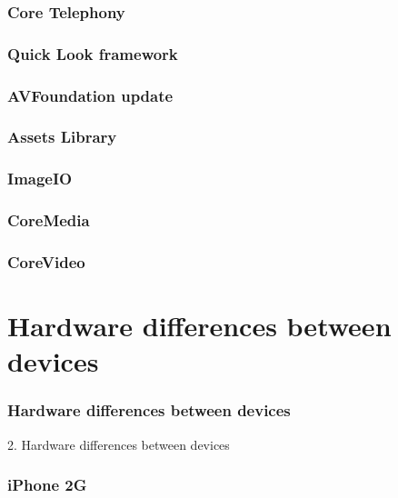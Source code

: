 \documentclass[10pt]{beamer}
\begin{document}
    
\begin{frame}[fragile]
  \frametitle{Core Telephony}
  
\end{frame}

    
\begin{frame}[fragile]
  \frametitle{Quick Look framework}
  
\end{frame}

    
\begin{frame}[fragile]
  \frametitle{AVFoundation update}
  
\end{frame}

    
\begin{frame}[fragile]
  \frametitle{Assets Library}
  
\end{frame}

    
\begin{frame}[fragile]
  \frametitle{ImageIO}
  
\end{frame}

    
\begin{frame}[fragile]
  \frametitle{CoreMedia}
  
\end{frame}

    
\begin{frame}[fragile]
  \frametitle{CoreVideo}
  
\end{frame}

    

   
  

  
    
\section{Hardware differences between devices}
\begin{frame}[fragile]
  \frametitle{Hardware differences between devices}
  2. Hardware differences between devices
\end{frame}


    
\begin{frame}[fragile]
  \frametitle{iPhone 2G}
  
\end{frame}
\end{document}

